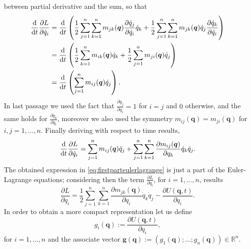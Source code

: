 		between partial derivative and the sum, so that 
		\begin{subequations}
			\label{eq:blekinetic}
			\begin{align}
				\frac{\diff}{\diff t}\frac{\partial L}{\partial \dot{q}_{i}} 
				&= \frac{\diff}{\diff t}\left(\frac{1}{2}\sum_{j=1}^{n}
				\sum_{k=1}^{n}m_{jk}(\bm{q})\frac{\partial\dot{q}_{j}}{\partial\dot{q}_{i}}\dot{q}_{k}
				+\frac{1}{2}\sum_{j=1}^{n}\sum_{k=1}^{n}m_{jk}(\bm{q})\dot{q}_{j}
				\frac{\partial\dot{q}_{k}}{\partial\dot{q}_{i}}\right)\\
				&=\frac{\diff}{\diff t}\left(\frac{1}{2}\sum_{k=1}^{n}m_{ik}(\bm{q})\dot{q}_{k}
				+\frac{1}{2}\sum_{j=1}^{n}m_{ji}(\bm{q})\dot{q}_{j}\right)\\
				&= \frac{\diff}{\diff t}\left(\sum_{j=1}^{n}m_{ij}(\bm{q})\dot{q}_{j}\right).
			\end{align}
		\end{subequations}
		In last passage we used the fact that
		$\frac{\partial\dot{q}_{j}}{\partial\dot{q}_{i}} = 1$ for $i = j$ and $0$ otherwise,
		and the same holds for $\frac{\partial\dot{q}_{k}}{\partial\dot{q}_{i}}$,
		moreover we also used the symmetry $m_{ij}(\bm{q})=m_{ji}(\bm{q})$ for $i,j = 1,\dots,n$.
		Finally deriving with respect to time results,
		\begin{equation}
			\label{eq:firstparteulerlagrange}
			\frac{\mathop{}\!\mathrm{d}}{\mathop{}\!\mathrm{d} t}\frac{\partial L}{\partial\dot{q}_{i}}
			= \sum_{j=1}^{n}m_{ij}(\bm{q})\ddot{q}_{j}
			+ \sum_{j=1}^{n}\sum_{k=1}^{n}
			\frac{\partial m_{ij}(\bm{q})}{\partial q_{k}}\dot{q}_{k}\dot{q}_{j}.
		\end{equation}
		The obtained expression in \cref{eq:firstparteulerlagrange} is just a part
		of the Euler-Lagrange equations; considering then the term
		$\frac{\partial L}{\partial q_{i}}$, for $i=1,\dots,n$, results 
		\begin{equation}
			\label{eq:secondparteulerlagrange}
			\frac{\partial L}{\partial q_{i}} 
			= \frac{1}{2} \sum_{j=1}^{n}
			\sum_{k=1}^{n}\frac{\partial m_{jk}(\bm{q})}{\partial q_{i}}\dot{q}_{k}\dot{q}_{j}
			-\frac{\partial U(\bm{q},t)}{\partial q_{i}}.
		\end{equation}
		In order to obtain a more compact representation let us define 
		\begin{equation*}
			g_{i}(\bm{q}) := \frac{\partial U(\bm{q},t)}{\partial q_{i}},
		\end{equation*}
		for $i=1,\dots,n$ and the associate vector 
		$\bm{g}(\bm{q}):=(g_{1}(\bm{q});\dots;g_{n}(\bm{q}))\in\mathbb{R}^{n}$.
